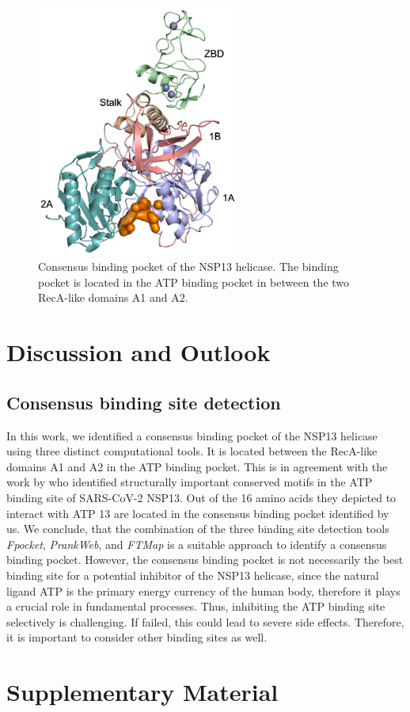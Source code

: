 \documentclass[11pt, letterpaper, titlepage]{article}
\begin{document}
\begin{figure}
    \centering
    \includegraphics[width=0.6\textwidth]{consens_domain_big.pdf}
    \caption{Consensus binding pocket of the NSP13 helicase. The binding pocket is located in the ATP binding pocket in between the two RecA-like domains A1 and A2.}
    \label{consensus_binding_pocket}
\end{figure}
\FloatBarrier

\section{Discussion and Outlook}

\subsection{Consensus binding site detection}
In this work, we identified a consensus binding pocket of the NSP13 helicase using three distinct computational tools. It is located between the RecA-like domains A1 and A2 in the ATP binding pocket. This is in agreement with the work by \textcite{Berta_2021} who identified structurally important conserved motifs in the ATP binding site of SARS-CoV-2 NSP13. Out of the 16 amino acids they depicted to interact with ATP 13 are located in the consensus binding pocket identified by us. We conclude, that the combination of the three binding site detection tools \textit{Fpocket}, \textit{PrankWeb}, and \textit{FTMap} is a suitable approach to identify a consensus binding pocket. 
However, the consensus binding pocket is not necessarily the best binding site for a potential inhibitor of the NSP13 helicase, since the natural ligand ATP is the primary energy currency of the human body, therefore it plays a crucial role in fundamental processes. Thus, inhibiting the ATP binding site selectively is challenging. If failed, this could lead to severe side effects. Therefore, it is important to consider other binding sites as well. %


\section{Supplementary Material}

\pagebreak
\FloatBarrier

\renewcommand{\bibname}{References}  %
\printbibliography
\end{document}
